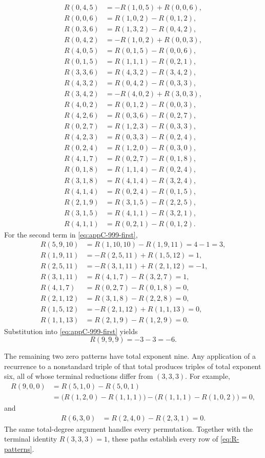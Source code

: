 \documentclass[11pt]{article}
\theoremstyle{definition}
\begin{document}
\begin{align*}
R(0,4,5)
&=-R(1,0,5)+R(0,0,6),\\
R(0,0,6)&=R(1,0,2)-R(0,1,2),\\
R(0,3,6)
&=R(1,3,2)-R(0,4,2),\\
R(0,4,2)&=-R(1,0,2)+R(0,0,3),\\
R(4,0,5)
&=R(0,1,5)-R(0,0,6),\\
R(0,1,5)&=R(1,1,1)-R(0,2,1),\\
R(3,3,6)
&=R(4,3,2)-R(3,4,2),\\
R(4,3,2)&=R(0,4,2)-R(0,3,3),\\
R(3,4,2)
&=-R(4,0,2)+R(3,0,3),\\
R(4,0,2)&=R(0,1,2)-R(0,0,3),\\
R(4,2,6)
&=R(0,3,6)-R(0,2,7),\\
R(0,2,7)&=R(1,2,3)-R(0,3,3),\\
R(4,2,3)
&=R(0,3,3)-R(0,2,4),\\
R(0,2,4)&=R(1,2,0)-R(0,3,0),\\
R(4,1,7)
&=R(0,2,7)-R(0,1,8),\\
R(0,1,8)&=R(1,1,4)-R(0,2,4),\\
R(3,1,8)
&=R(4,1,4)-R(3,2,4),\\
R(4,1,4)&=R(0,2,4)-R(0,1,5),\\
R(2,1,9)
&=R(3,1,5)-R(2,2,5),\\
R(3,1,5)&=R(4,1,1)-R(3,2,1),\\
R(4,1,1)
&=R(0,2,1)-R(0,1,2).
\end{align*}
For the second term in \eqref{eq:appC-999-first},
\begin{align*}
R(5,9,10)
&=R(1,10,10)-R(1,9,11)=4-1=3,\\
R(1,9,11)
&=-R(2,5,11)+R(1,5,12)=1,\\
R(2,5,11)
&=-R(3,1,11)+R(2,1,12)=-1,\\
R(3,1,11)
&=R(4,1,7)-R(3,2,7)=1,\\
R(4,1,7)
&=R(0,2,7)-R(0,1,8)=0,\\
R(2,1,12)
&=R(3,1,8)-R(2,2,8)=0,\\
R(1,5,12)
&=-R(2,1,12)+R(1,1,13)=0,\\
R(1,1,13)
&=R(2,1,9)-R(1,2,9)=0.
\end{align*}
Substitution into \eqref{eq:appC-999-first} yields
\[
R(9,9,9)=-3-3=-6.
\]

The remaining two zero patterns have total exponent nine. Any application of a recurrence to a nonstandard triple of that total produces triples of total exponent six, all of whose terminal reductions differ from $(3,3,3)$. For example,
\begin{align*}
R(9,0,0)
&=R(5,1,0)-R(5,0,1)\\
&=\bigl(R(1,2,0)-R(1,1,1)\bigr)
-\bigl(R(1,1,1)-R(1,0,2)\bigr)=0,
\end{align*}
and
\begin{align*}
R(6,3,0)
&=R(2,4,0)-R(2,3,1)=0.
\end{align*}
The same total-degree argument handles every permutation. Together with the terminal identity $R(3,3,3)=1$, these paths establish every row of \eqref{eq:R-patterns}.
\end{document}
